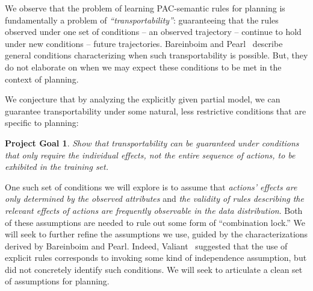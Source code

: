 \documentclass[12pt]{article}
\newtheorem{problem}{Project Goal}
\begin{document}
We observe that the problem of learning PAC-semantic rules for planning is fundamentally a problem of {\em ``transportability''}: guaranteeing that the rules observed under one set of conditions -- an observed trajectory -- continue to hold under new conditions -- future trajectories. Bareinboim and Pearl~\cite{bareinboim2012completeness,bareinboim2013algorithm} describe general conditions characterizing when such transportability is possible. %
But, they do not elaborate on when we may expect these conditions to be met in the context of planning.

We conjecture that by analyzing the explicitly given partial model, we can guarantee transportability under some natural, less restrictive conditions that are specific to planning:
\begin{problem}
Show that transportability can be guaranteed under conditions that only require the individual effects, not the entire sequence of actions, to be exhibited in the training set. 
\end{problem}
One such set of conditions we will explore is to assume that {\em actions' effects are only determined by the observed attributes} and {\em the validity of rules describing the relevant effects of actions are frequently observable in the data distribution}. Both of these assumptions are needed to rule out some form of ``combination lock.'' We will seek to further refine the assumptions we use, guided by the characterizations derived by Bareinboim and Pearl. Indeed, Valiant~\cite{valiant2006knowledgeInfusion} suggested that the use of explicit rules corresponds to invoking some kind of independence assumption, but did not concretely identify such conditions. We will seek to articulate a clean set of assumptions for planning.




\end{document}
